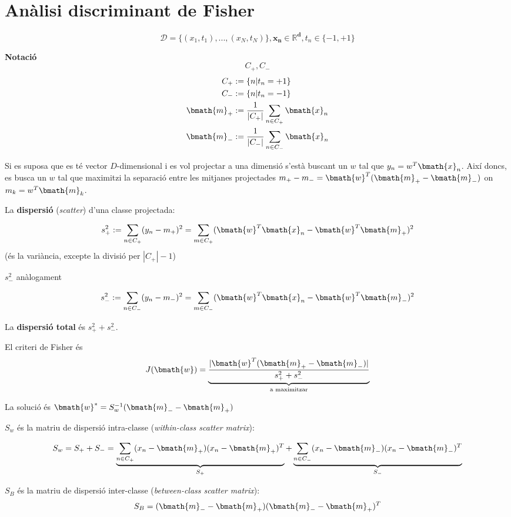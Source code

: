 \section{Anàlisi discriminant de Fisher}
$$  
\mathcal{D} = \{(x_1, t_1), ..., (x_N, t_N)\}, \boldsymbol{x_n \in \mathbb{R}^d}, t_n \in \{-1, +1 \}  
$$


\textbf{Notació}
$$  
C_+, C_-  
$$
\begin{align*}
	C_+ &:= \{ n | t_n = +1 \} \\
	C_- &:= \{ n | t_n = -1 \} \\
	\bmath{m}_+ &:= \frac{1}{|C_+|} \sum_{n\in C_+} \bmath{x}_n \\
	\bmath{m}_- &:= \frac{1}{|C_-|} \sum_{n\in C_-} \bmath{x}_n \\
\end{align*}

Si es suposa que es té vector $D$-dimensional i es vol projectar a una dimensió s'està buscant un $w$ tal que $y_n = w^T \bmath{x}_n$. Així doncs, es busca un $w$ tal que maximitzi la separació entre les mitjanes projectades $m_+ - m_- = \bmath{w}^T(\bmath{m}_+ - \bmath{m}_-)$ on $m_k = w^T \bmath{m}_k$.

La \textbf{dispersió} (\emph{scatter}) d'una classe projectada:

$$  
s_+^2 := \sum_{n \in C_+} (y_n - m_+)^2 = 
\sum_{m \in C_+} (\bmath{w}^T \bmath{x}_n - \bmath{w}^T \bmath{m}_+)^2
$$
(és la variància, excepte la divisió per $|C_+| - 1$)

$s_-^2$ anàlogament 

$$
s_-^2 := \sum_{n \in C_-} (y_n - m_-)^2 = 
\sum_{m \in C_-} (\bmath{w}^T \bmath{x}_n - \bmath{w}^T \bmath{m}_-)^2
$$

La \textbf{dispersió total} és $s_+^2 + s_-^2$.

El criteri de Fisher és $$  J(\bmath{w}) = \underbrace{\frac{|\bmath{w}^T(\bmath{m}_+-\bmath{m}_-)|}{s_+^2 + s_-^2}}_\text{a maximitzar}  $$

La solució és $\bmath{w}^* = S_w^{-1}(\bmath{m}_- - \bmath{m}_+)$

$S_w$ és la matriu de dispersió intra-classe (\emph{within-class scatter matrix}):

$$
S_w = S_+ + S_- = 
\underbrace{\sum_{n \in C_+} (x_n - \bmath{m}_+)(x_n - \bmath{m}_+)^T}_{S_+} +
\underbrace{\sum_{n \in C_-} (x_n - \bmath{m}_-)(x_n - \bmath{m}_-)^T}_{S_-}  
$$


$S_B$ és la matriu de dispersió inter-classe (\emph{between-class scatter matrix}):
$$
S_B = (\bmath{m}_- - \bmath{m}_+)(\bmath{m}_- - \bmath{m}_+)^T
$$